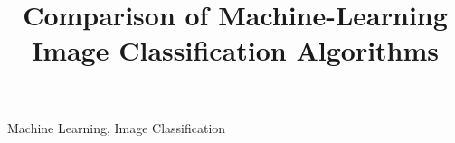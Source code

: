 \documentclass[conference]{IEEEtran}
\begin{document}
\title{Comparison of Machine-Learning Image Classification Algorithms}

\author{
}

\maketitle

\begin{abstract}
\end{abstract}

\begin{IEEEkeywords}
Machine Learning, Image Classification
\end{IEEEkeywords}



%

%

\end{document}
